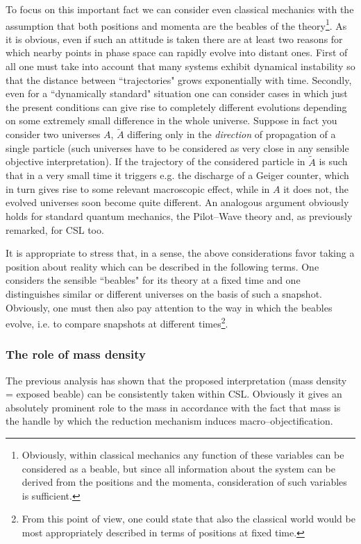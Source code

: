 \documentclass[12pt]{article}
\begin{document}
To focus on this important fact we can consider even classical
mechanics with the assumption that both positions and momenta are
the beables of the theory\footnote{Obviously, within classical
mechanics any function of these variables can be considered as a
beable, but since all information about the system can be derived
from the positions and the momenta, consideration of such
variables is sufficient.}. As it is obvious, even if such an attitude
is taken there are at least two reasons for which nearby points in
phase space can rapidly evolve into distant ones. First of all one
must take into account that many systems exhibit dynamical
instability so that the distance between ``trajectories" grows
exponentially with time. Secondly, even for a ``dynamically
standard" situation one can consider cases in which just the
present conditions can give rise to completely different
evolutions depending on some extremely small difference in the
whole universe. Suppose in fact you consider two universes $A$,
$\tilde A$ differing only in the {\it direction} of propagation of
a single particle (such universes have to be considered as very
close in any sensible objective interpretation). If the trajectory
of the considered particle in $\tilde A$ is such that in a very
small time it triggers e.g. the discharge of a Geiger counter,
which in turn gives rise to some relevant macroscopic effect,
while in $A$ it does not, the evolved universes soon become quite
different. An analogous argument obviously holds for standard
quantum mechanics, the Pilot--Wave theory and, as previously
remarked, for CSL too.

It is appropriate to stress that, in a sense, the above
considerations favor taking a position about reality which can be
described in the following terms. One considers the sensible
``beables" for its theory at a fixed time and one distinguishes
similar or different universes on the basis of such a snapshot.
Obviously, one must then also pay attention to the way in which
the beables evolve, i.e. to compare snapshots at different
times\footnote{From this point of view, one could state that also
the classical world would be most appropriately described in terms
of positions at fixed time.}.


\subsubsection{The role of mass density} \label{sec1253}

The previous analysis has shown that the proposed interpretation
(mass density = exposed beable) can be consistently taken within
CSL. Obviously it gives an absolutely prominent role to the mass
in accordance with the fact that mass is the handle by which the
reduction mechanism induces macro--objectification.
\end{document}
